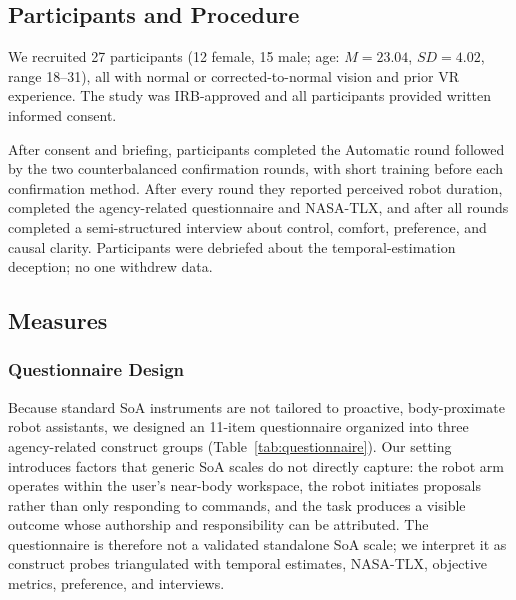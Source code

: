 \documentclass[sigconf,review,anonymous]{acmart}
\begin{document}
\subsection{Participants and Procedure}
We recruited 27 participants (12 female, 15 male; age: $M = 23.04$, $SD = 4.02$, range 18--31), all with normal or corrected-to-normal vision and prior VR experience. The study was IRB-approved and all participants provided written informed consent.

After consent and briefing, participants completed the Automatic round followed by the two counterbalanced confirmation rounds, with short training before each confirmation method. After every round they reported perceived robot duration, completed the agency-related questionnaire and NASA-TLX, and after all rounds completed a semi-structured interview about control, comfort, preference, and causal clarity. Participants were debriefed about the temporal-estimation deception; no one withdrew data.

\subsection{Measures}

\subsubsection{Questionnaire Design}
\label{sec:questionnaire}
Because standard SoA instruments are not tailored to proactive, body-proximate robot assistants, we designed an 11-item questionnaire organized into three agency-related construct groups (Table~\ref{tab:questionnaire}). Our setting introduces factors that generic SoA scales do not directly capture: the robot arm operates within the user's near-body workspace, the robot initiates proposals rather than only responding to commands, and the task produces a visible outcome whose authorship and responsibility can be attributed. The questionnaire is therefore not a validated standalone SoA scale; we interpret it as construct probes triangulated with temporal estimates, NASA-TLX, objective metrics, preference, and interviews.
\end{document}
